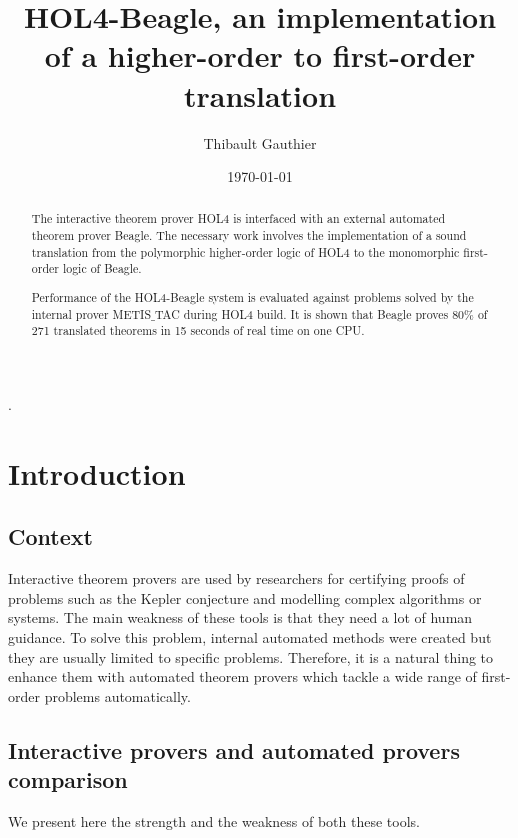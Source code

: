 \documentclass[a4paper, 11pt]{article}
\title{HOL4-Beagle, an implementation of a higher-order to first-order translation}
\author{Thibault Gauthier}
\date{\today}
\theoremstyle{plain}
\theoremstyle{definition}
\theoremstyle{remark}
\begin{document}
\newcommand{\slice}[4]{
  \pgfmathparse{0.5*#1+0.5*#2}
  \let\midangle\pgfmathresult
  \draw[thick,fill=black!10] (0,0) -- (#1:1) arc (#1:#2:1) -- cycle;
  \node[label=\midangle:#4] at (\midangle:1) {};
  \pgfmathparse{min((#2-#1-10)/110*(-0.3),0)}
  \let\temp\pgfmathresult
  \pgfmathparse{max(\temp,-0.5) + 0.8}
  \let\innerpos\pgfmathresult
  \node at (\midangle:\innerpos) {#3};
}
\maketitle 


\begin{abstract}
\par The interactive theorem prover HOL4 is interfaced with an external automated theorem prover Beagle. The necessary work involves the implementation of a sound translation from the polymorphic higher-order logic of HOL4 to the monomorphic first-order logic of Beagle.
\par  Performance of the HOL4-Beagle system is evaluated against problems solved by the internal prover METIS$\_$TAC during HOL4 build. It is shown that Beagle proves 80$\%$ of 271 translated theorems in 15 seconds of real time on one CPU.
\end{abstract}
.
\pagebreak
\tableofcontents
\pagebreak

\section{Introduction}
\subsection{Context}
Interactive theorem provers are used by researchers for certifying proofs of problems such as the Kepler conjecture and modelling complex algorithms or systems. The main weakness of these tools is that they need a lot of human guidance. To solve this problem, internal automated methods were created but they are usually limited to specific problems. Therefore, it is a natural thing to enhance them with automated theorem provers which tackle a wide range of first-order problems automatically.

\subsection{Interactive provers and automated provers comparison} 
We present here the strength and the weakness of both these tools.
\end{document}
